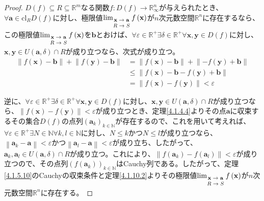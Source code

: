 \documentclass[dvipdfmx]{jsarticle}
\begin{document}
\begin{proof}
$D(f) \subseteq R \subseteq \mathbb{R}^{m}$なる関数$f:D(f) \rightarrow \mathbb{R}_{\infty}^{n}$が与えられたとき、$\forall\mathbf{a} \in \mathrm{cl}_{R}{D(f)}$に対し、極限値$\lim_{\scriptsize \begin{matrix} \mathbf{x} \rightarrow \mathbf{a} \\ R \rightarrow S \\\end{matrix}}{f\left( \mathbf{x} \right)}$が$n$次元数空間$\mathbb{R}^{n}$に存在するなら、この極限値$\lim_{\scriptsize \begin{matrix} \mathbf{x} \rightarrow \mathbf{a} \\ R \rightarrow S \\\end{matrix}}{f\left( \mathbf{x} \right)}$を$\mathbf{b}$とおけば、$\forall\varepsilon \in \mathbb{R}^{+}\exists\delta \in \mathbb{R}^{+}\forall\mathbf{x},\mathbf{y} \in D(f)$に対し、$\mathbf{x},\mathbf{y} \in U\left( \mathbf{a},\delta \right) \cap R$が成り立つなら、次式が成り立つ。
\begin{align*}
\left\| f\left( \mathbf{x} \right) - \mathbf{b} \right\| + \left\| f\left( \mathbf{y} \right) - \mathbf{b} \right\| &= \left\| f\left( \mathbf{x} \right) - \mathbf{b} \right\| + \left\| - f\left( \mathbf{y} \right) + \mathbf{b} \right\|\\
&\leq \left\| f\left( \mathbf{x} \right) - \mathbf{b} - f\left( \mathbf{y} \right) + \mathbf{b} \right\|\\
&= \left\| f\left( \mathbf{x} \right) - f\left( \mathbf{y} \right) \right\| < \varepsilon
\end{align*}\par
逆に、$\forall\varepsilon \in \mathbb{R}^{+}\exists\delta \in \mathbb{R}^{+}\forall\mathbf{x},\mathbf{y} \in D(f)$に対し、$\mathbf{x},\mathbf{y} \in U\left( \mathbf{a},\delta \right) \cap R$が成り立つなら、$\left\| f\left( \mathbf{x} \right) - f\left( \mathbf{y} \right) \right\| < \varepsilon$が成り立つとき、定理\ref{4.1.4.4}よりその点$\mathbf{a}$に収束するその集合$D(f)$の点列$\left( \mathbf{a}_{k} \right)_{k \in \mathbb{N}}$が存在するので、これを用いて考えれば、$\forall\varepsilon \in \mathbb{R}^{+}\exists N \in \mathbb{N}\forall k,l \in \mathbb{N}$に対し、$N \leq k$かつ$N \leq l$が成り立つなら、$\left\| \mathbf{a}_{k} - \mathbf{a} \right\| < \varepsilon$かつ$\left\| \mathbf{a}_{l} - \mathbf{a} \right\| < \varepsilon$が成り立ち、したがって、$\mathbf{a}_{k},\mathbf{a}_{l} \in U\left( \mathbf{a},\delta \right) \cap R$が成り立つ。これにより、$\left\| f\left( \mathbf{a}_{k} \right) - f\left( \mathbf{a}_{l} \right) \right\| < \varepsilon$が成り立つので、その点列$\left( f\left( \mathbf{a}_{k} \right) \right)_{k \in \mathbb{N}}$はCauchy列である。したがって、定理\ref{4.1.5.10}のCauchyの収束条件と定理\ref{4.1.10.2}よりその極限値$\lim_{\scriptsize \begin{matrix} \mathbf{x} \rightarrow \mathbf{a} \\ R \rightarrow S \\\end{matrix}}{f\left( \mathbf{x} \right)}$が$n$次元数空間$\mathbb{R}^{n}$に存在する。
\end{proof}
\end{document}
